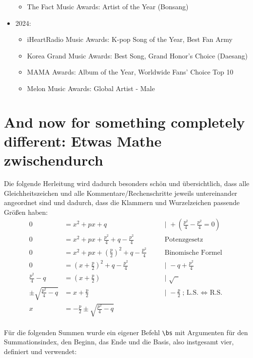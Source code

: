 \documentclass[a4paper,12pt]{article}
\begin{document}
\begin{itemize}
\begin{itemize}
        \item The Fact Music Awards: Artist of the Year (Bonsang)
    \end{itemize}
    \item 2024:
    \begin{itemize}
        \item iHeartRadio Music Awards: K-pop Song of the Year, Best Fan Army
        \item Korea Grand Music Awards: Best Song, Grand Honor's Choice (Daesang)
        \item MAMA Awards: Album of the Year, Worldwide Fans' Choice Top 10
        \item Melon Music Awards: Global Artist - Male
    \end{itemize}
\end{itemize}

\newpage
\section{And now for something completely different: Etwas Mathe zwischendurch}
Die folgende Herleitung wird dadurch besonders schön und übersichtlich, dass alle Gleichheitszeichen und alle Kommentare/Rechenschritte jeweils untereinander angeordnet sind und dadurch, dass die Klammern und Wurzelzeichen passende Größen haben:\\
\[
\begin{aligned}
    0 &= x^2 + px + q  &&\quad \text{| } + \left(\frac{p^2}{4} - \frac{p^2}{4} = 0\right) \\
    0 &= x^2 + px + \frac{p^2}{4} + q - \frac{p^2}{4}  &&\quad \text{Potenzgesetz} \\
    0 &= x^2 + px + \left(\frac{p}{2}\right)^2 + q - \frac{p^2}{4} &&\quad \text{Binomische Formel} \\
    0 &= \left(x + \frac{p}{2}\right)^2 + q - \frac{p^2}{4} &&\quad \text{| } - q + \frac{p^2}{4} \\
    \frac{p^2}{4} - q &= \left(x + \frac{p}{2}\right) &&\quad \text{| } \sqrt{\phantom{x}}\\
    \pm \sqrt{\frac{p^2}{4} - q} &= x + \frac{p}{2} &&\quad \text{| } - \frac{p}{2}\text{; L.S. $\Leftrightarrow$ R.S.}\\
    x &= - \frac{p}{2} \pm \sqrt{\frac{p^2}{4} - q}
\end{aligned}
\]\\
Für die folgenden Summen wurde ein eigener Befehl \verb|\bs| mit Argumenten für den Summationsindex, den Beginn, das Ende und die Basis, also instgesamt vier, definiert und verwendet:\\
\end{document}
